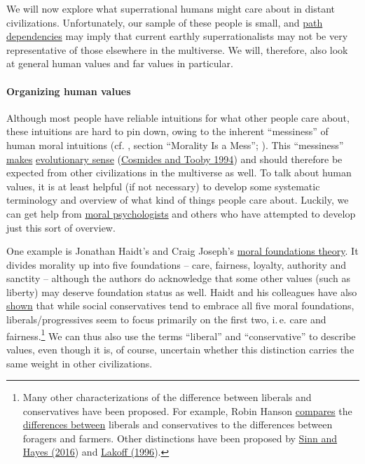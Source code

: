 We will now explore what superrational humans might care about in
distant civilizations. Unfortunately, our sample of these people is
small, and
\href{https://en.wikipedia.org/wiki/Path_dependence}{path
dependencies} may imply that current earthly superrationalists may not
be very representative of those elsewhere in the multiverse. We will,
therefore, also look at general human values and far values in
particular.

\hypertarget{organizing-human-values}{\paragraph{Organizing human
values}\label{organizing-human-values}}

Although most people have reliable intuitions for what other people care
about, these intuitions are hard to pin down, owing to the inherent
``messiness'' of human moral intuitions (cf.
\citet{Stewart-Williams2015-gg}, section ``Morality Is a
Mess''; \cite{Muehlhauser2012-ib}). This ``messiness''
\href{http://lesswrong.com/lw/l3/thou_art_godshatter/}{makes}
\href{https://en.wikipedia.org/wiki/Modularity_of_mind\#Evolutionary_psychology_and_massive_modularity}{evolutionary
sense}
(\href{http://citeseerx.ist.psu.edu/viewdoc/download?doi=10.1.1.140.7758\&rep=rep1\&type=pdf}{Cosmides
and Tooby 1994}) and should therefore be expected from other
civilizations in the multiverse as well. To talk about human values, it
is at least helpful (if not necessary) to develop some systematic
terminology and overview of what kind of things people care about.
Luckily, we can get help from
\href{https://en.wikipedia.org/wiki/Moral_psychology}{moral
psychologists} and others who have attempted to develop just this sort
of overview.

One example is Jonathan Haidt's and Craig Joseph's
\href{https://en.wikipedia.org/wiki/Moral_foundations_theory}{moral
foundations theory}. It divides morality up into five foundations --
care, fairness, loyalty, authority and sanctity -- although the authors
do acknowledge that some other values (such as liberty) may deserve
foundation status as well. Haidt and his colleagues have also
\href{https://en.wikipedia.org/wiki/Moral_foundations_theory\#Political_ideology}{shown}
that while social conservatives tend to embrace all five moral
foundations, liberals/progressives seem to focus primarily on the first
two, i.\,e. care and fairness.\footnote{Many other characterizations of
  the difference between liberals and conservatives have been proposed.
  For example, Robin Hanson
  \href{http://www.overcomingbias.com/2012/05/forager-vs-farmer-morality.html}{compares}
  the
  \href{http://www.overcomingbias.com/2010/10/two-types-of-people.html}{differences
  between} liberals and conservatives to the differences between
  foragers and farmers. Other distinctions have been proposed by
  \href{https://sl4librarian.files.wordpress.com/2017/01/sinn2016-replacing-the-moral-foundations.pdf}{Sinn
  and Hayes (2016}) and
  \href{https://en.wikipedia.org/wiki/Moral_Politics_(book)}{Lakoff
  (1996}).} We can thus also use the terms ``liberal'' and
``conservative'' to describe values, even though it is, of course,
uncertain whether this distinction carries the same weight in other
civilizations.

